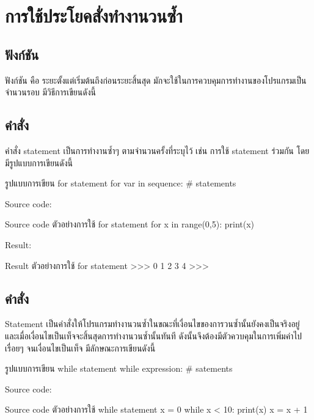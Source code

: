 \chapter{การใช้ประโยคสั่งทำงานวนซ้ำ}
\section{ฟังก์ชัน  }

ฟังก์ชัน   คือ ระยะตั้งแต่เริ่มต้นถึงก่อนระยะสิ้นสุด มักจะใช้ในการควบคุมการทำงานของโปรแกรมเป็นจำนวนรอบ มีวิธีการเขียนดังนี้  

\section{คำสั่ง  }

คำสั่ง   statement เป็นการทำงานซ้ำๆ ตามจำนวนครั้งที่ระบุไว้ เช่น การใช้   statement ร่วมกัน   โดยมีรูปแบบการเขียนดังนี้

\begin{codelist}{รูปแบบการเขียน for statement}{}
for var in sequence:
    # statements
\end{codelist}

Source code:
\begin{codelist}{Source code ตัวอย่างการใช้ for statement}{}
for x in range(0,5): print(x)
\end{codelist}

Result:
\begin{codelist}{Result ตัวอย่างการใช้ for statement}{}
>>>
0
1
2
3
4
>>>
\end{codelist}

\section{คำสั่ง  }

  Statement เป็นคำสั่งให้โปรแกรมทำงานวนซ้ำในขณะที่เงื่อนไขของการวนซ้ำนั้นยังคงเป็นจริงอยู่ และเมื่อเงื่อนไขเป็นเท็จจะสิ้นสุดการทำงานวนซ้ำนั้นทันที ดังนั้นจึงต้องมีตัวควบคุมในการเพิ่มค่าไปเรื่อยๆ จนเงื่อนไขเป็นเท็จ มีลักษณะการเขียนดังนี้

\begin{codelist}{รูปแบบการเขียน while statement}{}
while expression:
    # satements
\end{codelist}

Source code:
\begin{codelist}{Source code ตัวอย่างการใช้ while statement}{}
x = 0
while x < 10:
    print(x)
    x = x + 1
\end{codelist}

